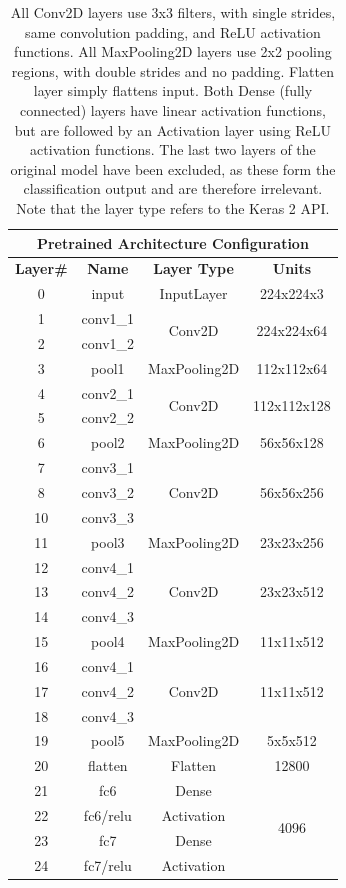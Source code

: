 \begin{table}[!h]
\begin{center}
\begin{tabular}{|c|c|c|c|}
\hline
\multicolumn{4}{|c|}{Pretrained Architecture Configuration} \\ \hline
\textbf{Layer#} & \textbf{Name} & \textbf{Layer Type} & \textbf{Units} \\ \hline
0 & input & InputLayer & 224x224x3  \\ \hline
1 & conv1\_1 & \multirow{2}{*}{Conv2D} & \multirow{2}{*}{224x224x64} \\ \cline{1-2}
2 & conv1\_2 & & \\ \hline
3 & pool1 & MaxPooling2D & 112x112x64 \\ \hline
4 & conv2\_1 & \multirow{2}{*}{Conv2D} & \multirow{2}{*}{112x112x128} \\ \cline{1-2}
5 & conv2\_2 & & \\ \hline
6 & pool2 & MaxPooling2D & 56x56x128 \\ \hline
7 & conv3\_1 & \multirow{3}{*}{Conv2D} & \multirow{3}{*}{56x56x256} \\ \cline{1-2}
8 & conv3\_2 & & \\ \cline{1-2}
10 & conv3\_3 & & \\ \hline
11 & pool3 & MaxPooling2D & 23x23x256 \\ \hline
12 & conv4\_1 & \multirow{3}{*}{Conv2D} & \multirow{3}{*}{23x23x512} \\ \cline{1-2}
13 & conv4\_2 & & \\ \cline{1-2}
14 & conv4\_3 & & \\ \hline
15 & pool4 & MaxPooling2D & 11x11x512 \\ \hline
16 & conv4\_1 & \multirow{3}{*}{Conv2D} & \multirow{3}{*}{11x11x512} \\ \cline{1-2}
17 & conv4\_2 & & \\ \cline{1-2}
18 & conv4\_3 & & \\ \hline
19 & pool5 & MaxPooling2D & 5x5x512 \\ \hline
20 & flatten & Flatten & 12800 \\ \hline
21 & fc6 & Dense & \multirow{4}{*}{4096} \\ \cline{1-3}
22 & fc6/relu & Activation & \\ \cline{1-3}
23 & fc7 & Dense & \\ \cline{1-3}
24 & fc7/relu & Activation & \\ \hline
\end{tabular}
\end{center}
\caption[Pretraining network architecture]{All Conv2D layers use 3x3 filters, with single strides, same convolution padding, and ReLU activation functions. All MaxPooling2D layers use 2x2 pooling regions, with double strides and no padding. Flatten layer simply flattens input. Both Dense (fully connected) layers have linear activation functions, but are followed by an Activation layer using ReLU activation functions. The last two layers of the original model have been excluded, as these form the classification output and are therefore irrelevant. Note that the layer type refers to the Keras 2 API.}
\label{tab:vggface-arch}
\end{table}

